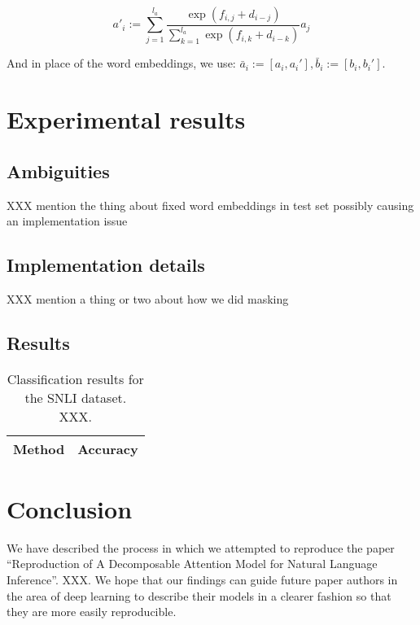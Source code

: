 \documentclass{article}
\begin{document}
\[a'_i := \sum_{j=1}^{l_a} \frac{\exp(f_{i,j} + d_{i-j})}{\sum_{k=1}^{l_a} \exp(f_{i,k} + d_{i-k})} a_j\]

And in place of the word embeddings, we use: $\bar{a}_i := [a_i, a_i'], \bar{b}_i := [b_i, b_i']$.

\section{Experimental results}

\subsection{Ambiguities}

XXX mention the thing about fixed word embeddings in test set possibly causing an implementation issue

\subsection{Implementation details}
XXX mention a thing or two about how we did masking

\subsection{Results}

\begin{table}[htbp]\centering
\begin{tabular}{|l|r|}
    \hline
    Method     & Accuracy \\ \hline
    \hline
\end{tabular}
\caption{Classification results for the SNLI dataset. XXX.}
\label{table:results}
\end{table}

\section{Conclusion}
We have described the process in which we attempted to reproduce the paper ``Reproduction of A Decomposable Attention Model for Natural Language Inference''. XXX. We hope that our findings can guide future paper authors in the area of deep learning to describe their models in a clearer fashion so that they are more easily reproducible.

{}

\end{document}
